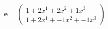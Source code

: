 \documentclass[preview]{standalone}
\begin{document}
\begin{align*}
\mathbf{e} = \begin{pmatrix}1 + 2x^{1} + 2x^{2} + 1x^{3} \\ 1 + 2x^{1} + -1x^{2} + -1x^{3}\end{pmatrix}
\end{align*}
\end{document}
